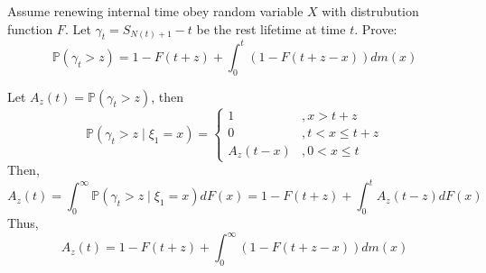 \documentclass{ctexart}
\begin{document}
\begin{problem}\label{pro:3}
  Assume renewing internal time obey random variable \(X\) with distrubution function \(F\).
  Let \(\gamma_t=S_{N(t) + 1}-t\) be the rest lifetime at time \(t\).
  Prove: \[
    \mathbb{P}(\gamma_t > z)=1-F(t + z) + \int_{0}^t(1-F(t + z -x))d m(x)
  \]
\end{problem}
\begin{solution}
  Let \(A_z(t)=\mathbb{P}(\gamma_t > z)\), then \[
    \mathbb{P}(\gamma_t > z \mid \xi_1=x)=
    \begin{cases}
      1        & , x > t + z         \\
      0        & , t < x \leq t + z \\
      A_z(t-x) & , 0 < x \leq t
    \end{cases}
  \]
  Then,
  \[
    A_z(t)=\int_{0}^\infty \mathbb{P}(\gamma_t > z \mid \xi_1=x)d F(x)=1-F(t + z) + \int_{0}^tA_z(t-z)dF(x)
  \]
  Thus, \[
    A_z(t)=1-F(t + z) + \int_{0}^\infty(1-F(t + z -x))dm(x)
  \]
\end{solution}
\end{document}
